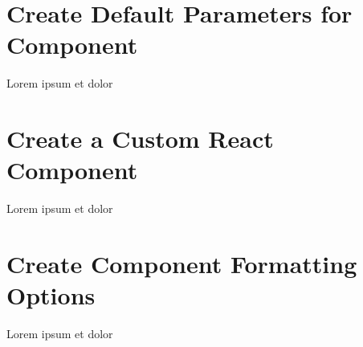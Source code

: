 \documentclass[letterpaper,10pt,english]{sphinxmanual}
\begin{document}
\begin{figure}[htbp]
\centering

\noindent{}
\end{figure}

\sphinxstepscope


\section{Create Default Parameters for Component}
\label{\detokenize{custom_component/default_parameters:create-default-parameters-for-component}}\label{\detokenize{custom_component/default_parameters::doc}}
\sphinxAtStartPar
Lorem ipsum et dolor

\sphinxstepscope


\section{Create a Custom React Component}
\label{\detokenize{custom_component/create_component:create-a-custom-react-component}}\label{\detokenize{custom_component/create_component::doc}}
\sphinxAtStartPar
Lorem ipsum et dolor

\sphinxstepscope


\section{Create Component Formatting Options}
\label{\detokenize{custom_component/formatting_options:create-component-formatting-options}}\label{\detokenize{custom_component/formatting_options::doc}}
\sphinxAtStartPar
Lorem ipsum et dolor



\renewcommand{\indexname}{Index}
\printindex
\end{document}
